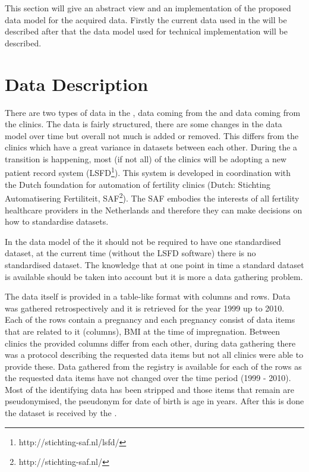 This section will give an abstract view and an implementation of the proposed data model for the acquired data.
Firstly the current data used in the \project{} will be described after that the data model used for technical implementation will be described.

\section{Data Description}
\label{datamodel-data-description}

There are two types of data in the \project{}, data coming from the \PRN{} and data coming from the clinics.
The \PRN{} data is fairly structured, there are some changes in the data model over time but overall not much is added or removed.
This differs from the clinics which have a great variance in datasets between each other.
During the \project{} a transition is happening, most (if not all) of the clinics will be adopting a new patient record system (LSFD\footnote{http://stichting-saf.nl/lsfd/}).
This system is developed in coordination with the Dutch foundation for automation of fertility clinics (Dutch: Stichting Automatisering Fertiliteit, SAF\footnote{http://stichting-saf.nl/}).
The SAF embodies the interests of all fertility healthcare providers in the Netherlands and therefore they can make decisions on how to standardise datasets.

In the data model of the \ivfsystem{} it should not be required to have one standardised dataset, at the current time (without the LSFD software) there is no standardised dataset.
The knowledge that at one point in time a standard dataset is available should be taken into account but it is more a data gathering problem.

The data itself is provided in a table-like format with columns and rows.
Data was gathered retrospectively and it is retrieved for the year 1999 up to 2010.
Each of the rows contain a pregnancy and each pregnancy consist of data items that are related to it (columns), \eg{} BMI at the time of impregnation.
Between clinics the provided columns differ from each other, during data gathering there was a protocol describing the requested data items but not all clinics were able to provide these.
Data gathered from the \PRN{} registry is available for each of the rows as the requested data items have not changed over the time period (1999 - 2010).
Most of the identifying data has been stripped and those items that remain are pseudonymised, \eg{} the pseudonym for date of birth is age in years.
After this is done the dataset is received by the \ivfsystem{}.

